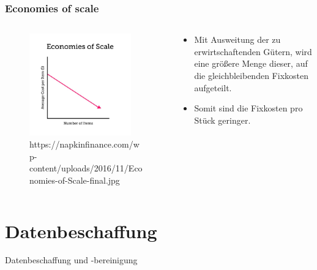 \documentclass{beamer}
\begin{document}
\begin{frame}
\frametitle{Economies of scale}

\begin{columns}
    \begin{column}{0.5\textwidth}
  \begin{figure}[h]
    \centering
      \includegraphics[width=0.9\textwidth]{economies_of_scale}
      \caption{https://napkinfinance.com/wp-content/uploads/2016/11/Economies-of-Scale-final.jpg}
  \end{figure}
    \end{column}
    \begin{column}{0.5\textwidth}
    \begin{itemize}
    \item
  Mit Ausweitung der zu
  erwirtschaftenden Gütern,
  wird eine größere Menge
  dieser, auf die
  gleichbleibenden Fixkosten
  aufgeteilt.
\item
  Somit sind die Fixkosten pro
  Stück geringer.

    \end{itemize}
    \end{column}
\end{columns}
\end{frame}


\section{Datenbeschaffung}
\begin{frame}
	\begin{center}
		{\Huge Datenbeschaffung und -bereinigung}
	\end{center}
\end{frame}
\end{document}
